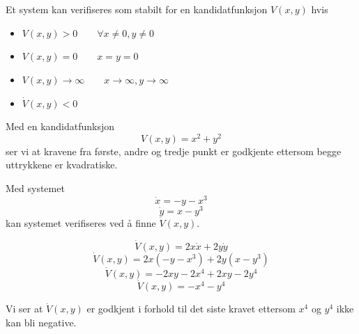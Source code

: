 \documentclass[norsk]{article}
\begin{document}
\section{}
Et system kan verifiseres som stabilt for en kandidatfunksjon \(V(x,y)\) hvis
\begin{itemize}
\item \(V(x, y) > 0 \qquad \forall x \neq 0, y \neq 0\)
\item \(V(x,y) = 0 \qquad x = y = 0\)
\item \(V(x,y) \rightarrow \infty \qquad x \rightarrow \infty, y \rightarrow \infty\)
\item \(\dot{V}(x,y) < 0 \)
\end{itemize}
Med en kandidatfunksjon \[V(x,y) = x^2 +  y^2\] ser vi at kravene fra første, andre og tredje punkt er godkjente ettersom begge uttrykkene er kvadratiske.

Med systemet \[\dot{x} = -y-x^3\] \[\dot{y} = x - y^3\] kan systemet verifiseres ved å finne \(\dot{V}(x, y)\).

\[\dot{V}(x,y) = 2x\dot{x} + 2y\dot{y}\]
\[\dot{V}(x,y) = 2x(-y-x^3) + 2y(x-y^3)\]
\[\dot{V}(x,y)=-2xy-2x^4 + 2xy-2y^4\]
\[\dot{V}(x,y) = -x^4-y^4\]

Vi ser at \(\dot{V}(x,y)\) er godkjent i forhold til det siste kravet ettersom \(x^4\) og \(y^4\) ikke kan bli negative.



\section{}
\end{document}
